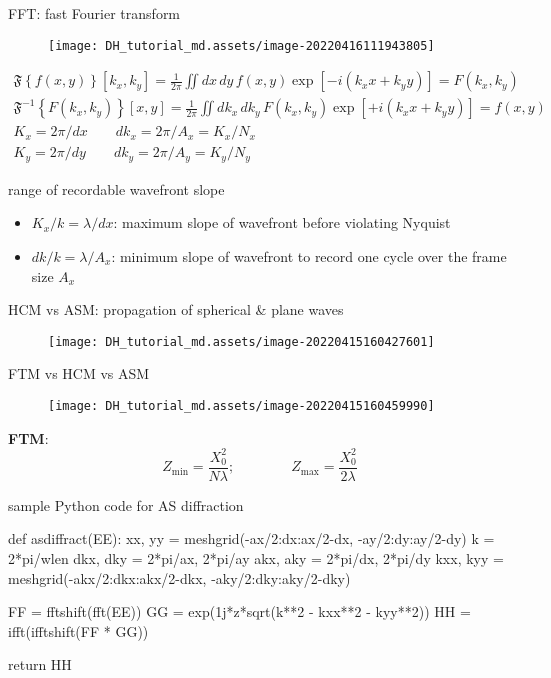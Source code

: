 \documentclass[t, aspectratio=169]{beamer}
\begin{document}
\begin{frame}{FFT: fast Fourier transform}
	\begin{figure}
		\texttt{[image: DH\_tutorial\_md.assets/image-20220416111943805]}
	\end{figure}
	\begin{gather*}
\mathfrak F\left\{f(x,y)\right\}[k_x,k_y] = \frac{1}{2\pi}\iint dx\,dy\,f(x,y)\exp\left[-i(k_x x + k_yy)\right] = F(k_x,k_y) \\
\mathfrak F^{-1}\left\{F(k_x,k_y)\right\}[x,y] = \frac{1}{2\pi}\iint dk_x\,dk_y\,F(k_x,k_y)\exp\left[+i(k_x x + k_yy)\right] = f(x,y) \\
K_x = 2\pi/dx \qquad dk_x = 2\pi/A_x = K_x/N_x \\
K_y = 2\pi/dy \qquad dk_y = 2\pi/A_y = K_y/N_y
	\end{gather*}
\end{frame}


\begin{frame}{range of recordable wavefront slope}
	\begin{itemize}
		\item $K_x/k=\lambda/dx$: maximum slope of wavefront before violating Nyquist
		\item $dk/k = \lambda/A_x$: minimum slope of wavefront to record one cycle over the frame size $A_x$ 
	\end{itemize}
\end{frame}


\begin{frame}{HCM vs ASM: propagation of spherical \& plane waves}
	\begin{figure}
		\texttt{[image: DH\_tutorial\_md.assets/image-20220415160427601]}
	\end{figure}
\end{frame}


\begin{frame}{FTM vs HCM vs ASM}
	\begin{figure}
		\texttt{[image: DH\_tutorial\_md.assets/image-20220415160459990]}
	\end{figure}
	\textbf{FTM}: 
	\[ Z_{\min} = \frac{X_0^2}{N\lambda}; \qquad\qquad Z_{\max} = \frac{X_0^2}{2\lambda} \]
\end{frame}


\begin{frame}[fragile]{sample Python code for AS diffraction}
	\begin{semiverbatim}
def asdiffract(EE):    
    xx, yy = meshgrid(-ax/2:dx:ax/2-dx, -ay/2:dy:ay/2-dy)
    k = 2*pi/wlen
    dkx, dky = 2*pi/ax, 2*pi/ay
    akx, aky = 2*pi/dx, 2*pi/dy
    kxx, kyy = meshgrid(-akx/2:dkx:akx/2-dkx, -aky/2:dky:aky/2-dky)
    
    FF = fftshift(fft(EE))    
    GG = exp(1j*z*sqrt(k**2 - kxx**2 - kyy**2))    
    HH = ifft(ifftshift(FF * GG))
    
    return HH    
	\end{semiverbatim}
\end{frame}
\end{document}
